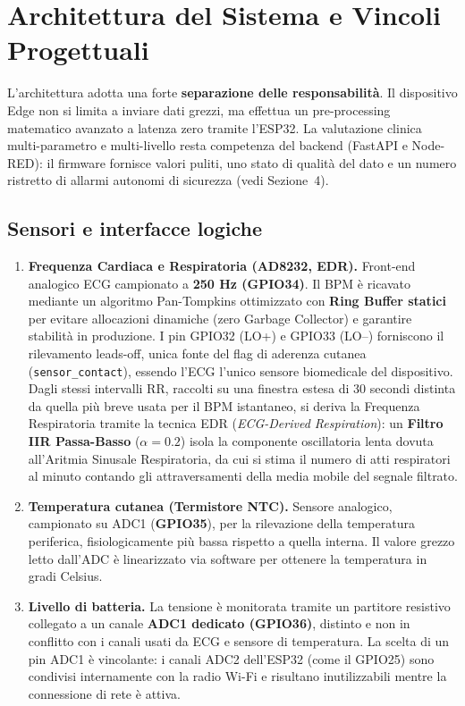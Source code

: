 \documentclass[11pt,a4paper]{article}
\begin{document}
\newpage
\section{Architettura del Sistema e Vincoli Progettuali}

L'architettura adotta una forte \textbf{separazione delle responsabilità}. Il dispositivo Edge non si limita a inviare dati grezzi, ma effettua un pre-processing matematico avanzato a latenza zero tramite l'ESP32. La valutazione clinica multi-parametro e multi-livello resta competenza del backend (FastAPI e Node-RED): il firmware fornisce valori puliti, uno stato di qualità del dato e un numero ristretto di allarmi autonomi di sicurezza (vedi Sezione~4).

\subsection{Sensori e interfacce logiche}
\begin{enumerate}[leftmargin=1.5em,itemsep=3pt]
  \item \textbf{Frequenza Cardiaca e Respiratoria (AD8232, EDR).} Front-end analogico ECG campionato a \textbf{250 Hz (GPIO34)}. Il BPM è ricavato mediante un algoritmo Pan-Tompkins ottimizzato con \textbf{Ring Buffer statici} per evitare allocazioni dinamiche (zero Garbage Collector) e garantire stabilità in produzione. I pin GPIO32 (LO+) e GPIO33 (LO--) forniscono il rilevamento leads-off, unica fonte del flag di aderenza cutanea (\texttt{sensor\_contact}), essendo l'ECG l'unico sensore biomedicale del dispositivo. Dagli stessi intervalli RR, raccolti su una finestra estesa di 30 secondi distinta da quella più breve usata per il BPM istantaneo, si deriva la Frequenza Respiratoria tramite la tecnica EDR (\emph{ECG-Derived Respiration}): un \textbf{Filtro IIR Passa-Basso} ($\alpha = 0.2$) isola la componente oscillatoria lenta dovuta all'Aritmia Sinusale Respiratoria, da cui si stima il numero di atti respiratori al minuto contando gli attraversamenti della media mobile del segnale filtrato.
  \item \textbf{Temperatura cutanea (Termistore NTC).} Sensore analogico, campionato su ADC1 (\textbf{GPIO35}), per la rilevazione della temperatura periferica, fisiologicamente più bassa rispetto a quella interna. Il valore grezzo letto dall'ADC è linearizzato via software per ottenere la temperatura in gradi Celsius.
  \item \textbf{Livello di batteria.} La tensione è monitorata tramite un partitore resistivo collegato a un canale \textbf{ADC1 dedicato (GPIO36)}, distinto e non in conflitto con i canali usati da ECG e sensore di temperatura. La scelta di un pin ADC1 è vincolante: i canali ADC2 dell'ESP32 (come il GPIO25) sono condivisi internamente con la radio Wi-Fi e risultano inutilizzabili mentre la connessione di rete è attiva.
\end{enumerate}
\end{document}
